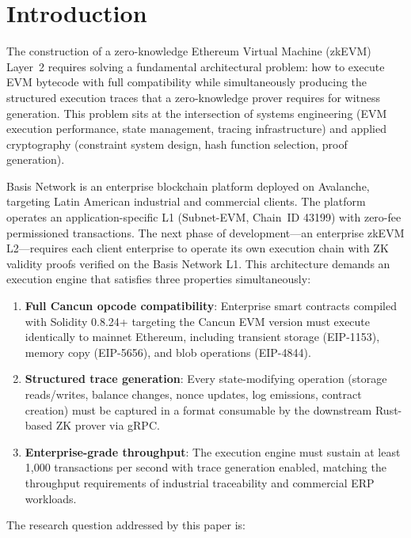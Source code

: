 
\section{Introduction}

The construction of a zero-knowledge Ethereum Virtual Machine (zkEVM) Layer~2
requires solving a fundamental architectural problem: how to execute EVM bytecode
with full compatibility while simultaneously producing the structured execution
traces that a zero-knowledge prover requires for witness generation. This problem
sits at the intersection of systems engineering (EVM execution performance, state
management, tracing infrastructure) and applied cryptography (constraint system
design, hash function selection, proof generation).

Basis Network is an enterprise blockchain platform deployed on Avalanche,
targeting Latin American industrial and commercial clients. The platform operates
an application-specific L1 (Subnet-EVM, Chain~ID 43199) with zero-fee
permissioned transactions. The next phase of development---an enterprise zkEVM
L2---requires each client enterprise to operate its own execution chain with
ZK validity proofs verified on the Basis Network L1. This architecture demands
an execution engine that satisfies three properties simultaneously:

\begin{enumerate}
  \item \textbf{Full Cancun opcode compatibility}: Enterprise smart contracts
    compiled with Solidity 0.8.24+ targeting the Cancun EVM version must execute
    identically to mainnet Ethereum, including transient storage (EIP-1153),
    memory copy (EIP-5656), and blob operations (EIP-4844).
  \item \textbf{Structured trace generation}: Every state-modifying operation
    (storage reads/writes, balance changes, nonce updates, log emissions,
    contract creation) must be captured in a format consumable by the downstream
    Rust-based ZK prover via gRPC.
  \item \textbf{Enterprise-grade throughput}: The execution engine must sustain
    at least 1{,}000 transactions per second with trace generation enabled,
    matching the throughput requirements of industrial traceability and
    commercial ERP workloads.
\end{enumerate}

The research question addressed by this paper is:

